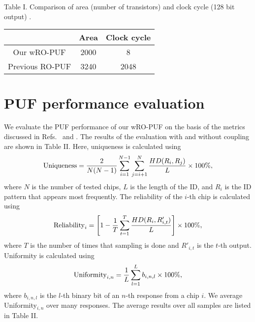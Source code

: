 \documentclass[%
reprint, amsmath,amssymb,%
pra,
]{revtex4-1}
\begin{document}
\begin{table}
\begin{center}
Table I. 
{Comparison of area (number of transistors) and clock cycle (128 bit output) }. 
\begin{tabular}{|c|c|c|}\hline
&   Area  %
&   Clock cycle
\\ \hline
Our wRO-PUF 
& 2000 
& 8
\\
Previous RO-PUF
& 3240  
& 2048 
\\ \hline
\end{tabular}
\end{center}
\end{table}

\section{PUF performance evaluation}
We evaluate the PUF performance of our wRO-PUF on the basis 
of the metrics discussed in Refs.~\cite{Maiti3} and \cite{Hori}.
The results of the evaluation with and without coupling are shown in Table II.
Here, uniqueness is calculated using
\begin{equation}
{\rm Uniqueness}=\frac{2}{N(N-1)}\sum_{i=1}^{N-1}\sum_{j=i+1}^N
\frac{HD(R_i,R_j)}{L}\times 100\%,
\end{equation}
where $N$ is the number of tested chips, $L$ is  
the length of the ID, and $R_i$ is the ID pattern that appears most frequently.
The reliability of the $i$-th chip is calculated using
\begin{equation}
{\rm Reliability}_i= \left[1-\frac{1}{T}\sum_{t=1}^{T}\frac{HD(R_i,R'_{i,t})}{L} \right]\times 100\%,
\end{equation}
where $T$ is the number of times that sampling is done and $R'_{i,t}$ is the $t$-th output.  
Uniformity is calculated using 
\begin{equation}
{\rm Uniformity}_{i,n}=\frac{1}{L}\sum_{l=1}^{L} b_{i,n,l} \times 100 \%,
\end{equation}
where $b_{i,n,l}$ is the $l$-th binary bit of an $n$-th response from a chip $i$. %
We average Uniformity${}_{i,n}$ over many responses.
The average results over all samples are listed in Table II.
\end{document}
